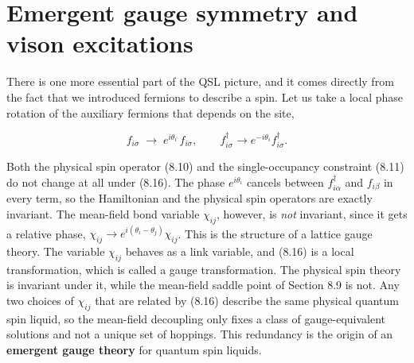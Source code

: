\section{Emergent gauge symmetry and vison excitations}

There is one more essential part of the QSL picture, and it comes directly from the fact that we
introduced fermions to describe a spin. Let us take a local phase rotation of the auxiliary
fermions that depends on the site,

\begin{equation}
f_{i\sigma} \;\to\; e^{i\theta_i}\, f_{i\sigma}, \qquad f^\dagger_{i\sigma} \to e^{-i\theta_i}
f^\dagger_{i\sigma}.
\end{equation}

Both the physical spin operator (8.10) and the single-occupancy constraint (8.11) do not change at
all under (8.16). The phase $e^{i\theta_i}$ cancels between $f^\dagger_{i\alpha}$ and
$f_{i\beta}$ in every term, so the Hamiltonian and the physical spin operators are exactly
invariant. The mean-field bond variable $\chi_{ij}$, however, is \emph{not} invariant, since it
gets a relative phase, $\chi_{ij} \to e^{i(\theta_i - \theta_j)}\chi_{ij}$. This is the structure
of a lattice gauge theory. The variable $\chi_{ij}$ behaves as a link variable, and (8.16) is a
local transformation, which is called a gauge transformation. The physical spin theory is invariant
under it, while the mean-field saddle point of Section 8.9 is not. Any two choices of $\chi_{ij}$
that are related by (8.16) describe the same physical quantum spin liquid, so the mean-field
decoupling only fixes a class of gauge-equivalent solutions and not a unique set of hoppings. This
redundancy is the origin of an \textbf{emergent gauge theory} for quantum spin liquids.

